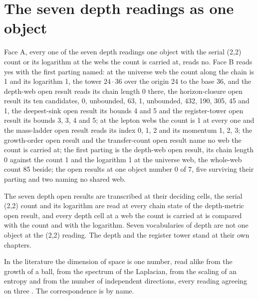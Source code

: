 \section{The seven depth readings as one object}\label{mod:X-4-D543126-w-svdq}
\begin{chwall}\label{box:X-4-D543126-w-svdq:1}
Face A, every one of the seven depth readings one object with the serial (2,2) count or its logarithm at the webs the count is carried at, reads no. Face B reads yes with the first parting named: at the universe web the count along the chain is 1 and its logarithm 1, the tower $24\cdot 36$ over the origin 24 to the base 36, and the depth-web open result reads its chain length 0 there, the horizon-closure open result its ten candidates, 0, unbounded, 63, 1, unbounded, 432, 190, 305, 45 and 1, the deepest-sink open result its bounds 4 and 5 and the register-tower open result its bounds 3, 3, 4 and 5; at the lepton webs the count is 1 at every one and the mass-ladder open result reads its index 0, 1, 2 and its momentum 1, 2, 3; the growth-order open result and the transfer-count open result name no web the count is carried at; the first parting is the depth-web open result, its chain length 0 against the count 1 and the logarithm 1 at the universe web, the whole-web count 85 beside; the open results at one object number 0 of 7, five surviving their parting and two naming no shared web.
\end{chwall}
The seven depth open results are transcribed at their deciding cells, the serial (2,2) count and its logarithm are read at every chain state of the depth-metric open result, and every depth cell at a web the count is carried at is compared with the count and with the logarithm. Seven vocabularies of depth are not one object at the (2,2) reading. The depth and the register tower stand at their own chapters.
\begin{chbridge}
In the literature the dimension of space is one number, read alike from the growth of a ball, from the spectrum of the Laplacian, from the scaling of an entropy and from the number of independent directions, every reading agreeing on three \cite{Wald1984,HawkingEllis1973}. The correspondence is by name.
\end{chbridge}
